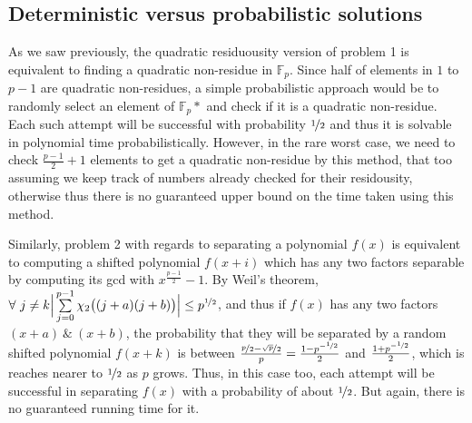 \documentclass{report}
\begin{document}
\begin{comment}
We are concerned, in this thesis, with the distribution of quadratic residues and quadratic non-residues modulo a prime $p$ over the elements in $\mathbb{F}_p$. Apart from the theoretical interest in the matter in and of itself, it also has applications in many practically relevant problems. We will specifically tackle the problems of
\begin{itemize}
    \item finding a square root of an element in $\mathbb{F}_p$ and
    \item factoring quadratic polynomials in $\mathbb{F}_p$.
\end{itemize}
In this chapter we will explore the background and preliminaries needed for the rest of the thesis.
\end{comment}


\subsection*{Deterministic versus probabilistic solutions}

As we saw previously, the quadratic residuousity version of problem 1 is equivalent to finding a quadratic non-residue in $\mathbb{F}_p$. Since half of elements in $1$ to $p-1$ are quadratic non-residues, a simple probabilistic approach would be to randomly select an element of $\mathbb{F}_p*$ and check if it is a quadratic non-residue. Each such attempt will be successful with probability $\nicefrac{1}{2}$ and thus it is solvable in polynomial time probabilistically. However, in the rare worst case, we need to check $\frac{p-1}{2}+1$ elements to get a quadratic non-residue by this method, that too assuming we keep track of numbers already checked for their residousity, otherwise thus there is no guaranteed upper bound on the time taken using this method.

Similarly, problem 2 with regards to separating a polynomial $f(x)$ is equivalent to computing a shifted polynomial $f(x+i)$ which has any two factors separable by computing its gcd with $x^{\frac{p-1}{2}}-1$. By Weil's theorem, $\forall\ j\neq k \Big\lvert\sum\limits_{j=0}^{p-1}\chi_2\big((j+a)(j+b)\big)\Big\rvert\leq p^{\nicefrac{1}{2}}$, and thus if $f(x)$ has any two factors $(x+a)\ \& \ (x+b)$, the probability that they will be separated by a random shifted polynomial $f(x+k)$ is between $\frac{\nicefrac{p}{2}-\nicefrac{\sqrt{p}}{2}}{p}= \frac{1-p^{-\nicefrac{1}{2}}}{2}$ and $\frac{1+p^{-\nicefrac{1}{2}}}{2}$, which is reaches nearer to $\nicefrac{1}{2}$ as $p$ grows. Thus, in this case too, each attempt will be successful in separating $f(x)$ with a probability of about $\nicefrac{1}{2}$. But again, there is no guaranteed running time for it.
\end{document}
